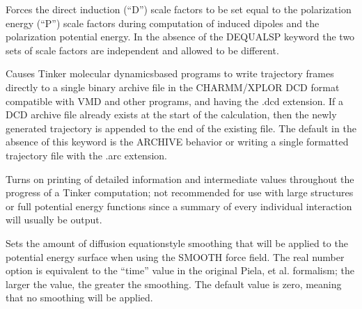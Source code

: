 \documentclass[letterpaper,11pt,english]{sphinxmanual}
\begin{document}
\ignorespaces {}\label{\detokenize{text/keywords:key-d-equals-p}}\begin{description}
\sphinxAtStartPar
Forces the direct induction (“D”) scale factors to be set equal to the polarization energy (“P”) scale factors during computation of induced dipoles and the polarization potential energy. In the absence of the D\sphinxhyphen{}EQUALS\sphinxhyphen{}P keyword the two sets of scale factors are independent and allowed to be different.

\end{description}

\ignorespaces {}\label{\detokenize{text/keywords:key-dcd-archive}}\begin{description}
\sphinxAtStartPar
Causes Tinker molecular dynamics\sphinxhyphen{}based programs to write trajectory frames directly to a single binary archive file in the CHARMM/XPLOR DCD format compatible with VMD and other programs, and having the .dcd extension. If a DCD archive file already exists at the start of the calculation, then the newly generated trajectory is appended to the end of the existing file. The default in the absence of this keyword is the ARCHIVE behavior or writing a single formatted trajectory file with the .arc extension.

\end{description}

\ignorespaces {}\label{\detokenize{text/keywords:key-debug}}\begin{description}
\sphinxAtStartPar
Turns on printing of detailed information and intermediate values throughout the progress of a Tinker computation; not recommended for use with large structures or full potential energy functions since a summary of every individual interaction will usually be output.

\end{description}

\ignorespaces {}\label{\detokenize{text/keywords:key-deform}}\begin{description}
\sphinxAtStartPar
Sets the amount of diffusion equation\sphinxhyphen{}style smoothing that will be applied to the potential energy surface when using the SMOOTH force field. The real number option is equivalent to the “time” value in the original Piela, et al. formalism; the larger the value, the greater the smoothing. The default value is zero, meaning that no smoothing will be applied.

\end{description}
\end{document}

